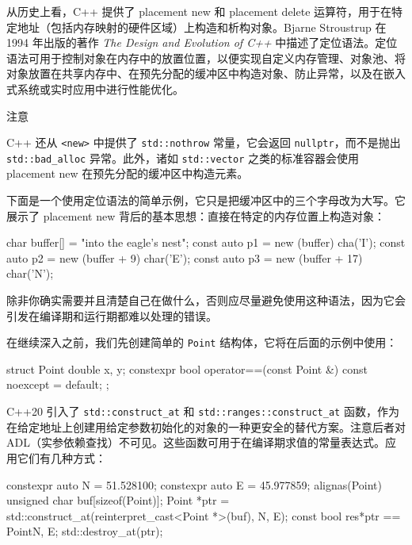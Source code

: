 \label{idx:612}
从历史上看，C++ 提供了 placement new 和 placement delete 运算符，用于在特定地址（包括内存映射的硬件区域）上构造和析构对象。Bjarne Stroustrup 在 1994 年出版的著作 \emph{The Design and Evolution of C++} 中描述了定位语法。定位语法可用于控制对象在内存中的放置位置，以便实现自定义内存管理、对象池、将对象放置在共享内存中、在预先分配的缓冲区中构造对象、防止异常，以及在嵌入式系统或实时应用中进行性能优化。

\begin{myNotic}{注意}

C++ 还从 \texttt{<new>} 中提供了 \texttt{std::\allowbreak{}nothrow} 常量，它会返回 \texttt{nullptr}，而不是抛出 \texttt{std::\allowbreak{}bad\_\allowbreak{}alloc} 异常。此外，诸如 \texttt{std::\allowbreak{}vector} 之类的标准容器会使用 placement new 在预先分配的缓冲区中构造元素。
\end{myNotic}

\label{idx:613}
下面是一个使用定位语法的简单示例，它只是把缓冲区中的三个字母改为大写。它展示了 placement new 背后的基本思想：直接在特定的内存位置上构造对象：

\begin{codebox}[text]
char buffer[] = "into the eagle's nest";
const auto p1 = new (buffer) cha('I');
const auto p2 = new (buffer + 9) char('E');
const auto p3 = new (buffer + 17) char('N');
\end{codebox}

除非你确实需要并且清楚自己在做什么，否则应尽量避免使用这种语法，因为它会引发在编译期和运行期都难以处理的错误。

在继续深入之前，我们先创建简单的 \texttt{Point} 结构体，它将在后面的示例中使用：

\begin{codebox}[cpp]
struct Point {
    double x, y;
    constexpr bool operator==(const Point &) const noexcept = default;
};
\end{codebox}

\label{idx:614}
C++20 引入了 \texttt{std::\allowbreak{}construct\_\allowbreak{}at} 和 \texttt{std::\allowbreak{}ranges::\allowbreak{}construct\_\allowbreak{}at} 函数，作为在给定地址上创建用给定参数初始化的对象的一种更安全的替代方案。注意后者对 ADL（实参依赖查找）不可见。这些函数可用于在编译期求值的常量表达式。应用它们有几种方式：

\begin{codebox}[cpp]
constexpr auto N = 51.528100;
constexpr auto E = 45.977859;
alignas(Point) unsigned char buf[sizeof(Point)];
Point *ptr = std::construct_at(reinterpret_cast<Point *>(buf), N, E);
const bool res{*ptr == Point{N, E}};
std::destroy_at(ptr);
\end{codebox}

